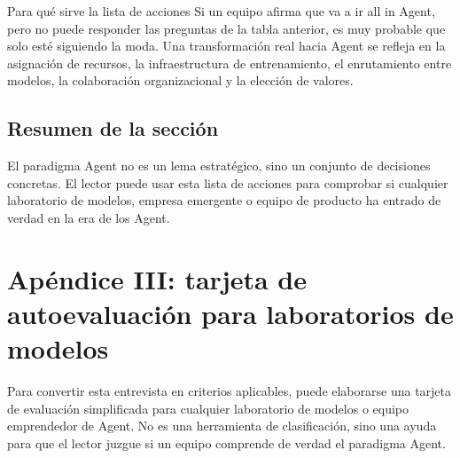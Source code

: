 \documentclass[a4paper]{article}
\begin{document}
\begin{importantbox}{Para qué sirve la lista de acciones}
Si un equipo afirma que va a ir all in Agent, pero no puede responder las preguntas de la tabla anterior, es muy probable que solo esté siguiendo la moda. Una transformación real hacia Agent se refleja en la asignación de recursos, la infraestructura de entrenamiento, el enrutamiento entre modelos, la colaboración organizacional y la elección de valores.
\end{importantbox}

\subsection{Resumen de la sección}

El paradigma Agent no es un lema estratégico, sino un conjunto de decisiones concretas. El lector puede usar esta lista de acciones para comprobar si cualquier laboratorio de modelos, empresa emergente o equipo de producto ha entrado de verdad en la era de los Agent.
\section{Apéndice III: tarjeta de autoevaluación para laboratorios de modelos}

Para convertir esta entrevista en criterios aplicables, puede elaborarse una tarjeta de evaluación simplificada para cualquier laboratorio de modelos o equipo emprendedor de Agent. No es una herramienta de clasificación, sino una ayuda para que el lector juzgue si un equipo comprende de verdad el paradigma Agent.
\end{document}

